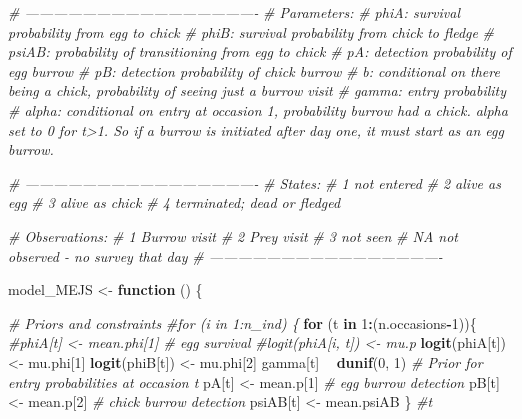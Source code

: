 \documentclass[]{article}
\newenvironment{Shaded}{\begin{snugshade}}{\end{snugshade}}
\newcommand{\KeywordTok}[1]{\textcolor[rgb]{0.13,0.29,0.53}{\textbf{#1}}}
\newcommand{\DecValTok}[1]{\textcolor[rgb]{0.00,0.00,0.81}{#1}}
\newcommand{\StringTok}[1]{\textcolor[rgb]{0.31,0.60,0.02}{#1}}
\newcommand{\CommentTok}[1]{\textcolor[rgb]{0.56,0.35,0.01}{\textit{#1}}}
\newcommand{\ControlFlowTok}[1]{\textcolor[rgb]{0.13,0.29,0.53}{\textbf{#1}}}
\newcommand{\OperatorTok}[1]{\textcolor[rgb]{0.81,0.36,0.00}{\textbf{#1}}}
\newcommand{\NormalTok}[1]{#1}
\begin{document}
\begin{Shaded}
\begin{Highlighting}[]
\CommentTok{# -------------------------------------------------}
\CommentTok{# Parameters:}
\CommentTok{# phiA: survival probability from egg to chick}
\CommentTok{# phiB: survival probability from chick to fledge}
\CommentTok{# psiAB: probability of transitioning from egg to chick}
\CommentTok{# pA: detection probability of egg burrow}
\CommentTok{# pB: detection probability of chick burrow}
\CommentTok{# b: conditional on there being a chick, probability of seeing just a burrow visit}
\CommentTok{# gamma: entry probability}
\CommentTok{# alpha: conditional on entry at occasion 1, probability burrow had a chick. alpha set to 0 for t>1. So if a burrow is initiated after day one, it must start as an egg burrow.  }

\CommentTok{# -------------------------------------------------}
\CommentTok{# States:}
\CommentTok{# 1 not entered}
\CommentTok{# 2 alive as egg}
\CommentTok{# 3 alive as chick}
\CommentTok{# 4 terminated; dead or fledged}

\CommentTok{# Observations:  }
\CommentTok{# 1 Burrow visit}
\CommentTok{# 2 Prey visit}
\CommentTok{# 3 not seen}
\CommentTok{# NA not observed - no survey that day}
\CommentTok{# -------------------------------------------------}

\NormalTok{model_MEJS <-}\StringTok{ }\ControlFlowTok{function}\NormalTok{ () \{}

\CommentTok{# Priors and constraints}
\CommentTok{#for (i in 1:n_ind) \{}
\ControlFlowTok{for}\NormalTok{ (t }\ControlFlowTok{in} \DecValTok{1}\OperatorTok{:}\NormalTok{(n.occasions}\OperatorTok{-}\DecValTok{1}\NormalTok{))\{}
 \CommentTok{#phiA[t] <- mean.phi[1]   # egg survival}
 \CommentTok{#logit(phiA[i, t]) <- mu.p}
 \KeywordTok{logit}\NormalTok{(phiA[t]) <-}\StringTok{ }\NormalTok{mu.phi[}\DecValTok{1}\NormalTok{]}
 \KeywordTok{logit}\NormalTok{(phiB[t]) <-}\StringTok{ }\NormalTok{mu.phi[}\DecValTok{2}\NormalTok{]}
\NormalTok{ gamma[t] }\OperatorTok{~}\StringTok{ }\KeywordTok{dunif}\NormalTok{(}\DecValTok{0}\NormalTok{, }\DecValTok{1}\NormalTok{)    }\CommentTok{# Prior for entry probabilities at occasion t}
\NormalTok{ pA[t] <-}\StringTok{ }\NormalTok{mean.p[}\DecValTok{1}\NormalTok{]     }\CommentTok{# egg burrow detection}
\NormalTok{ pB[t] <-}\StringTok{ }\NormalTok{mean.p[}\DecValTok{2}\NormalTok{]     }\CommentTok{# chick burrow detection}
\NormalTok{ psiAB[t] <-}\StringTok{ }\NormalTok{mean.psiAB}
\NormalTok{\} }\CommentTok{#t}


\end{Highlighting}
\end{Shaded}
\end{document}
